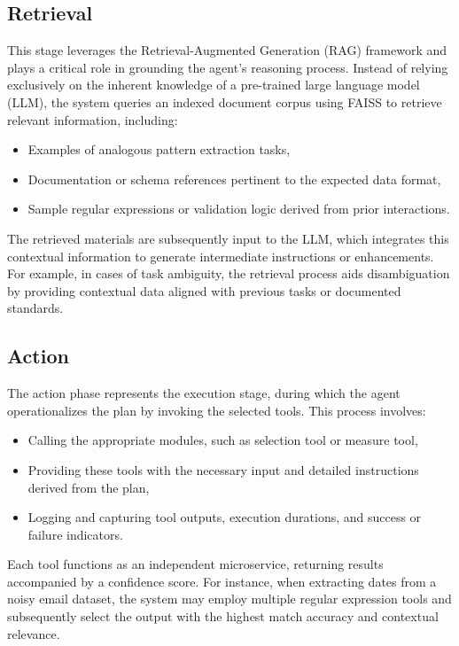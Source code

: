 \subsection{Retrieval}
This stage leverages the Retrieval-Augmented Generation (RAG) framework and plays a critical role in grounding the agent’s reasoning process. Instead of relying exclusively on the inherent knowledge of a pre-trained large language model (LLM), the system queries an indexed document corpus using FAISS to retrieve relevant information, including:

\begin{itemize}
    \item Examples of analogous pattern extraction tasks,
    \item Documentation or schema references pertinent to the expected data format,
    \item Sample regular expressions or validation logic derived from prior interactions.
\end{itemize}

The retrieved materials are subsequently input to the LLM, which integrates this contextual information to generate intermediate instructions or enhancements. For example, in cases of task ambiguity, the retrieval process aids disambiguation by providing contextual data aligned with previous tasks or documented standards.


\subsection{Action}
The action phase represents the execution stage, during which the agent operationalizes the plan by invoking the selected tools. This process involves:

\begin{itemize}
    \item Calling the appropriate modules, such as selection tool or measure tool,
    \item Providing these tools with the necessary input and detailed instructions derived from the plan,
    \item Logging and capturing tool outputs, execution durations, and success or failure indicators.
\end{itemize}

Each tool functions as an independent microservice, returning results accompanied by a confidence score. For instance, when extracting dates from a noisy email dataset, the system may employ multiple regular expression tools and subsequently select the output with the highest match accuracy and contextual relevance.


